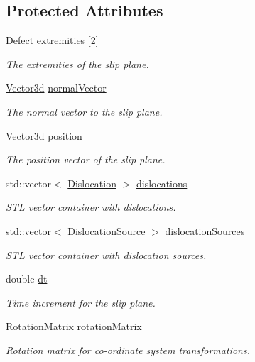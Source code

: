 \subsection*{Protected Attributes}
\begin{DoxyCompactItemize}
\item 
\hyperlink{classDefect}{Defect} \hyperlink{classSlipPlane_abbdbe6ed805faf3777b54ff55a9c089c}{extremities} \mbox{[}2\mbox{]}
\begin{DoxyCompactList}\small\item\em The extremities of the slip plane. \end{DoxyCompactList}\item 
\hyperlink{classVector3d}{Vector3d} \hyperlink{classSlipPlane_aad33ce7b595e5fc55aefe51c7b0957f2}{normal\-Vector}
\begin{DoxyCompactList}\small\item\em The normal vector to the slip plane. \end{DoxyCompactList}\item 
\hyperlink{classVector3d}{Vector3d} \hyperlink{classSlipPlane_ac2ac59e22e9638a990c9e45aaa096d9a}{position}
\begin{DoxyCompactList}\small\item\em The position vector of the slip plane. \end{DoxyCompactList}\item 
std\-::vector$<$ \hyperlink{classDislocation}{Dislocation} $>$ \hyperlink{classSlipPlane_ad92c7c409f7e161db449528389180910}{dislocations}
\begin{DoxyCompactList}\small\item\em S\-T\-L vector container with dislocations. \end{DoxyCompactList}\item 
std\-::vector$<$ \hyperlink{classDislocationSource}{Dislocation\-Source} $>$ \hyperlink{classSlipPlane_a8e31e904fc6e68cc7ba70b0b57a278cc}{dislocation\-Sources}
\begin{DoxyCompactList}\small\item\em S\-T\-L vector container with dislocation sources. \end{DoxyCompactList}\item 
double \hyperlink{classSlipPlane_ad786135547799363ad2931e43522c2be}{dt}
\begin{DoxyCompactList}\small\item\em Time increment for the slip plane. \end{DoxyCompactList}\item 
\hyperlink{classRotationMatrix}{Rotation\-Matrix} \hyperlink{classSlipPlane_a1aa5aacccb6bb03d163a95251aa10d6c}{rotation\-Matrix}
\begin{DoxyCompactList}\small\item\em Rotation matrix for co-\/ordinate system transformations. \end{DoxyCompactList}\end{DoxyCompactItemize}


